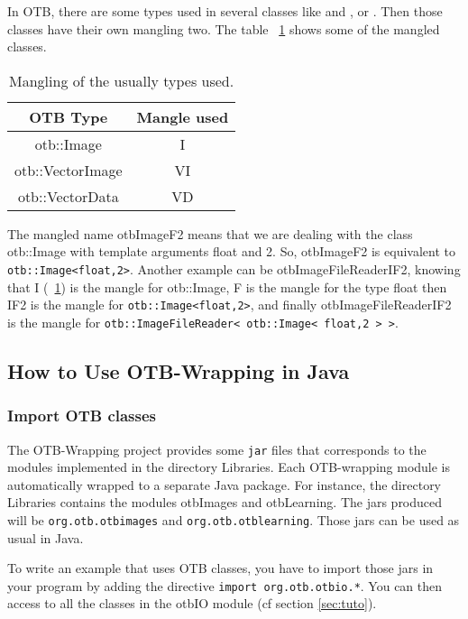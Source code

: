In OTB, there are some types used in several classes like  and  , or .
Then those classes have their own mangling two. The table ~\ref{tab:typetomangle} shows some of the mangled classes. 

\begin{table}[!htbp]
\begin{center}
\begin{tabular}{|c|c|}
\hline
OTB Type                  &  Mangle used  \\
\hline
otb::Image                 &  I         \\
otb::VectorImage           &  VI        \\
otb::VectorData            &  VD        \\
\hline 
\end{tabular}
\caption{Mangling of the usually types used.}\label{tab:typetomangle}
\end{center}
\end{table}


The mangled name otbImageF2 means that we are dealing with the class otb::Image with 
template arguments float and 2. So, otbImageF2 is equivalent to \verb|otb::Image<float,2>|. Another example 
can be otbImageFileReaderIF2, knowing that I (~\ref{tab:typetomangle}) is the mangle for otb::Image, F is the mangle 
for the type float then IF2 is the mangle for \verb|otb::Image<float,2>|, and
finally otbImageFileReaderIF2 is the mangle for \verb|otb::ImageFileReader< otb::Image< float,2 > >|.


\subsection{How to Use OTB-Wrapping in Java}

\subsubsection{Import OTB classes}
The OTB-Wrapping project provides some \verb|jar| files that corresponds to the
modules implemented in the directory Libraries. Each OTB-wrapping module is automatically wrapped to a separate Java package.
For instance, the directory Libraries contains the modules otbImages and
otbLearning. The jars produced will be \verb|org.otb.otbimages| and
\verb|org.otb.otblearning|. Those jars can be used as usual in Java.

To write an example that uses OTB classes, you have to import those jars in your program by adding the directive 
\verb?import org.otb.otbio.*?. You can then access to all the classes in the otbIO module (cf section \ref{sec:tuto}).


